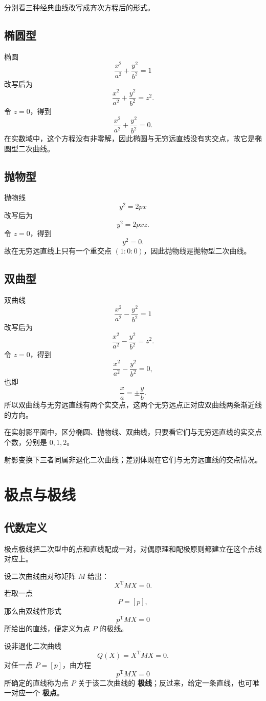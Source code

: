 分别看三种经典曲线改写成齐次方程后的形式。

\subsection{椭圆型}
椭圆
\[
\frac{x^2}{a^2}+\frac{y^2}{b^2}=1
\]
改写后为
\[
\frac{x^2}{a^2}+\frac{y^2}{b^2}=z^2.
\]
令 $z=0$，得到
\[
\frac{x^2}{a^2}+\frac{y^2}{b^2}=0.
\]
在实数域中，这个方程没有非零解，因此椭圆与无穷远直线没有实交点，故它是椭圆型二次曲线。

\subsection{抛物型}
抛物线
\[
y^2=2px
\]
改写后为
\[
y^2=2pxz.
\]
令 $z=0$，得到
\[
y^2=0.
\]
故在无穷远直线上只有一个重交点 $(1:0:0)$，因此抛物线是抛物型二次曲线。

\subsection{双曲型}
双曲线
\[
\frac{x^2}{a^2}-\frac{y^2}{b^2}=1
\]
改写后为
\[
\frac{x^2}{a^2}-\frac{y^2}{b^2}=z^2.
\]
令 $z=0$，得到
\[
\frac{x^2}{a^2}-\frac{y^2}{b^2}=0,
\]
也即
\[
\frac{x}{a}=\pm \frac{y}{b}.
\]
所以双曲线与无穷远直线有两个实交点，这两个无穷远点正对应双曲线两条渐近线的方向。

\begin{conclusion}
在实射影平面中，区分椭圆、抛物线、双曲线，只要看它们与无穷远直线的实交点个数，分别是 $0,1,2$。
\end{conclusion}

射影变换下三者同属非退化二次曲线；差别体现在它们与无穷远直线的交点情况。

\section{极点与极线}

\subsection{代数定义}
极点极线把二次型中的点和直线配成一对，对偶原理和配极原则都建立在这个点线对应上。

设二次曲线由对称矩阵 $M$ 给出：
\[
 X^{\mathrm T}M X=0.
\]
若取一点
\[
P=[ p],
\]
那么由双线性形式
\[
 p^{\mathrm T}M X=0
\]
所给出的直线，便定义为点 $P$ 的极线。

\begin{definition}
设非退化二次曲线
\[
Q( X)= X^{\mathrm T}M X=0.
\]
对任一点 $P=[ p]$，由方程
\[
 p^{\mathrm T}M X=0
\]
所确定的直线称为点 $P$ 关于该二次曲线的 \textbf{极线}；反过来，给定一条直线，也可唯一对应一个 \textbf{极点}。
\end{definition}

